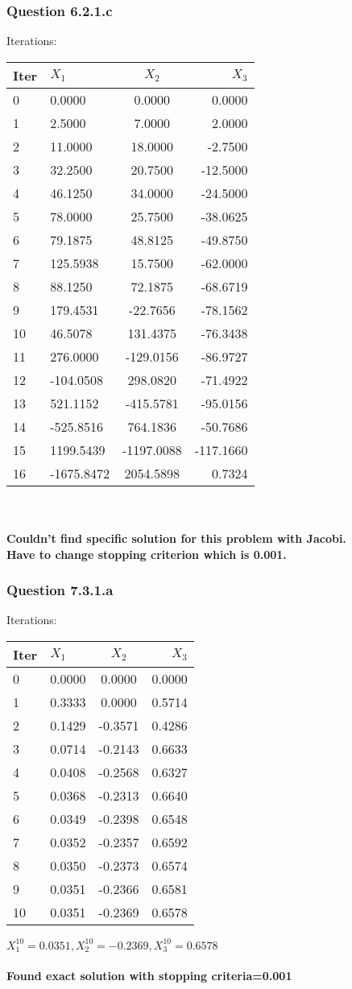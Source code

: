 \documentclass{article}
\begin{document}
\subsubsection{Question 6.2.1.c}
Iterations:
\begin{tabular}{l|l|c|r}
	Iter&$X_{1}$&$X_{2}$&$X_{3}$\\
	\hline
		 0&  0.0000&  0.0000&  0.0000\\
		1&  2.5000&  7.0000&  2.0000\\
		2& 11.0000& 18.0000& -2.7500\\
		3& 32.2500& 20.7500&-12.5000\\
		4& 46.1250& 34.0000&-24.5000\\
		5& 78.0000& 25.7500&-38.0625\\
		6& 79.1875& 48.8125&-49.8750\\
		7&125.5938& 15.7500&-62.0000\\
		8& 88.1250& 72.1875&-68.6719\\
		9&179.4531&-22.7656&-78.1562\\
		10& 46.5078&131.4375&-76.3438\\
		11&276.0000&-129.0156&-86.9727\\
		12&-104.0508&298.0820&-71.4922\\
		13&521.1152&-415.5781&-95.0156\\
		14&-525.8516&764.1836&-50.7686\\
		15&1199.5439&-1197.0088&-117.1660\\
		16&-1675.8472&2054.5898&  0.7324\\
	\hline
\end{tabular}\\\\
\textbf{Couldn't find specific solution for this problem with Jacobi.\\Have to change stopping criterion which is 0.001.}
\subsubsection{Question 7.3.1.a}
Iterations:
\begin{tabular}{l|l|c|r}
	Iter&$X_{1}$&$X_{2}$&$X_{3}$\\
	\hline
0&  0.0000&  0.0000&  0.0000\\
1&  0.3333&  0.0000&  0.5714\\
2&  0.1429& -0.3571&  0.4286\\
3&  0.0714& -0.2143&  0.6633\\
4&  0.0408& -0.2568&  0.6327\\
5&  0.0368& -0.2313&  0.6640\\
6&  0.0349& -0.2398&  0.6548\\
7&  0.0352& -0.2357&  0.6592\\
8&  0.0350& -0.2373&  0.6574\\
9&  0.0351& -0.2366&  0.6581\\
10&  0.0351& -0.2369&  0.6578\\
	\hline
\end{tabular}$X_{1}^{10}=0.0351,X_{2}^{10}=-0.2369,X_{3}^{10}=0.6578$ \\\\
\textbf{Found exact solution with stopping criteria=0.001}
\end{document}
